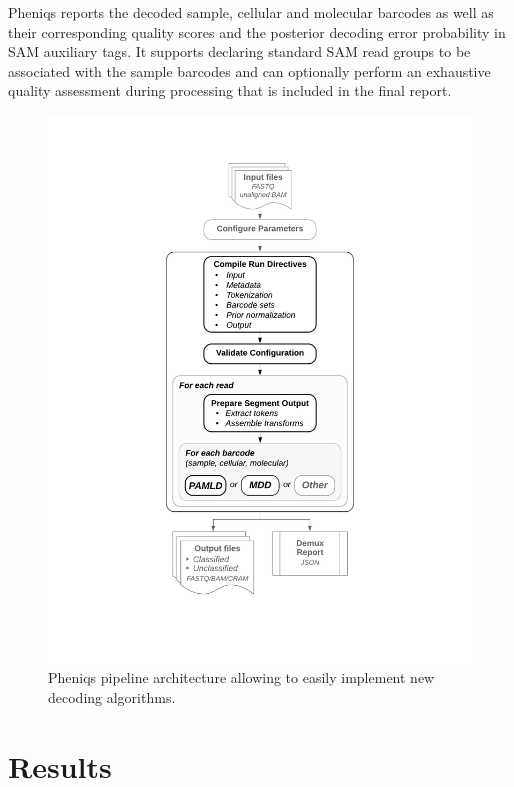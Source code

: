 \documentclass[twocolumn]{bmcart}
\begin{document}
Pheniqs reports the decoded sample, cellular and molecular barcodes as well as their corresponding quality scores and the posterior decoding error probability in SAM auxiliary tags. It supports declaring standard SAM read groups to be associated with the sample barcodes and can optionally perform an exhaustive quality assessment during processing that is included in the final report.

\begin{figure}[h!]
\centering
\includegraphics[keepaspectratio,scale=0.5]{pipeline_overview}
\caption{ Pheniqs pipeline architecture allowing to easily implement new decoding algorithms.}
\label{fig:02}
\end{figure}

\section*{Results}
%
%
\end{document}
